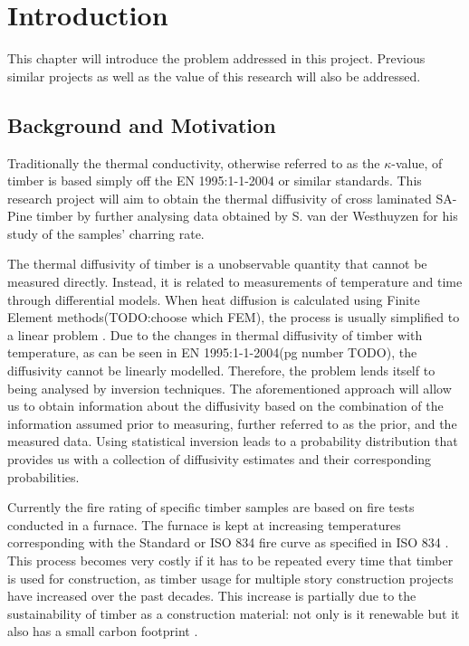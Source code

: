 \chapter{Introduction} \label{introduction}
This chapter will introduce the problem addressed in this project. 
Previous similar projects as well as the value of this research will also be addressed.

\section{Background and Motivation}

Traditionally the thermal conductivity, otherwise referred to as the $\kappa$-value, of timber is based simply off the EN 1995:1-1-2004 or similar standards.
This research project will aim to obtain the thermal diffusivity of cross laminated SA-Pine timber by further analysing data obtained by S. van der Westhuyzen for his study of the samples' charring rate.

The thermal diffusivity of timber is a unobservable quantity that cannot be measured directly. Instead, it is related to measurements of temperature and time through differential models. 
When heat diffusion is calculated using Finite Element methods(TODO:choose which FEM), the process is usually simplified to a linear problem \citep{Fish:2007}. 
Due to the changes in thermal diffusivity of timber with temperature, as can be seen in EN 1995:1-1-2004(pg number TODO), the diffusivity cannot be linearly modelled. 
Therefore, the problem lends itself to being analysed by inversion techniques. 
The aforementioned approach will allow us to obtain information about the diffusivity based on the combination of the information assumed prior to measuring, further referred to as the prior, and the measured data. 
Using statistical inversion leads to a probability distribution that provides us with a collection of diffusivity estimates and their corresponding probabilities.

Currently the fire rating of specific timber samples are based on fire tests conducted in a furnace. 
The furnace is kept at increasing temperatures corresponding with the Standard or ISO 834 fire curve as specified in ISO 834 \citet{ISO:1999}.
This process becomes very costly if it has to be repeated every time that timber is used for construction, as timber usage for multiple story construction projects have increased over the past decades. 
This increase is partially due to the sustainability of timber as a construction material: not only is it renewable but it also has a small carbon footprint \citep{Salvadori:2017}.



